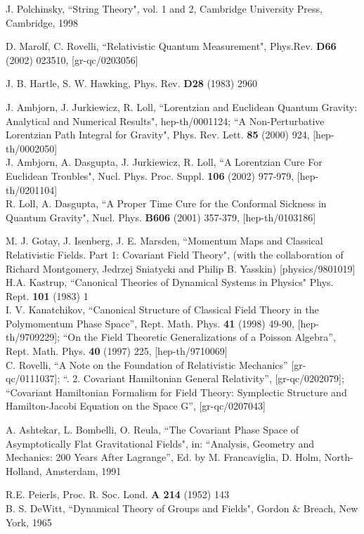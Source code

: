 \documentclass[12pt]{report}
\begin{document}
\begin{thebibliography}{99}
 J. Polchinsky, ``String Theory", vol. 1 and 2, Cambridge 
University Press, Cambridge, 1998

 D. Marolf, C. Rovelli, ``Relativistic Quantum Measurement", 
Phys.Rev. {\bf D66} (2002) 023510, [gr-qc/0203056] 

 J. B. Hartle, S. W. Hawking, Phys. Rev. {\bf D28} (1983) 
2960

J. Ambjorn, J. Jurkiewicz, R. Loll, ``Lorentzian and Euclidean Quantum 
Gravity: Analytical and Numerical Results", hep-th/0001124;
``A Non-Perturbative Lorentzian Path Integral for Gravity", Phys. Rev. 
Lett. {\bf 85} (2000) 924, [hep-th/0002050] \\
J. Ambjorn, A. Dasgupta, J. Jurkiewicz, R. Loll, ``A Lorentzian Cure For
Euclidean Troubles", 
Nucl. Phys. Proc. Suppl. {\bf 106} (2002) 977-979, [hep-th/0201104]\\
R. Loll, A. Dasgupta, ``A Proper Time Cure for the Conformal 
Sickness in Quantum Gravity", Nucl. Phys. {\bf B606} (2001) 357-379, 
[hep-th/0103186]

M. J. Gotay, J. Isenberg, J. E. Marsden, ``Momentum Maps and Classical
Relativistic Fields. Part 1: Covariant Field Theory",
(with the collaboration of Richard Montgomery, Jedrzej Sniatycki and 
Philip B. Yasskin) [physics/9801019] \\
H.A. Kastrup, ``Canonical Theories of Dynamical Systems in Physics" 
Phys. Rept. {\bf 101} (1983) 1\\ 
I. V. Kanatchikov, ``Canonical Structure of Classical Field Theory
in the Polymomentum Phase Space'', Rept. Math. Phys. {\bf 41}
(1998) 49-90, [hep-th/9709229]; ``On the Field Theoretic Generalizations 
of a Poisson Algebra'', Rept. Math. Phys. {\bf 40} (1997) 225, 
[hep-th/9710069]\\
C. Rovelli, ``A Note on the Foundation of Relativistic Mechanics''
[gr-qc/0111037]; ``. 2. Covariant Hamiltonian General Relativity'', 
[gr-qc/0202079]; ``Covariant Hamiltonian Formalism for Field Theory: 
Symplectic Structure and Hamilton-Jacobi Equation on the Space 
G'', [gr-qc/0207043]

 A. Ashtekar, L. Bombelli, O. Reula, 
``The Covariant Phase Space of 
Asymptotically Flat Gravitational Fields",  
in: ``Analysis, Geometry and Mechanics: 200 Years After 
Lagrange'', Ed. by M. Francaviglia, D. Holm, North-Holland, Amsterdam, 1991 

 R.E. Peierls, Proc. R. Soc. Lond. {\bf A 214} (1952) 143\\
B. S. DeWitt, ``Dynamical Theory of Groups and Fields", Gordon \& Breach,
New York, 1965 


\end{thebibliography}
\end{document}
